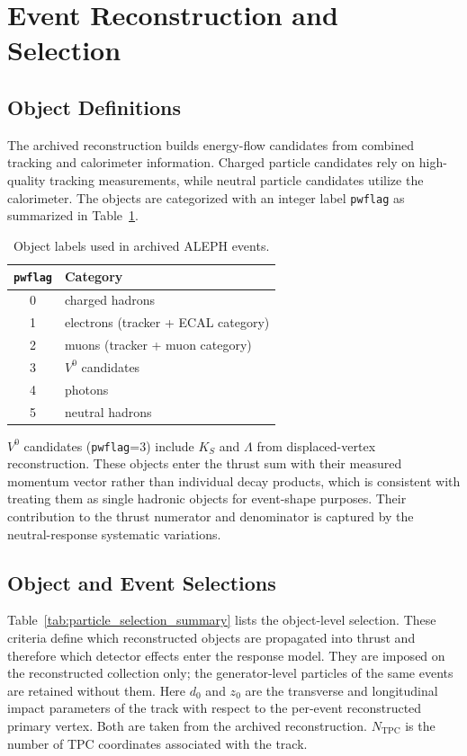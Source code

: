 \section{Event Reconstruction and Selection}
\label{sec:event_selection}

\subsection{Object Definitions}
\label{sec:particle_categories}

The archived reconstruction builds energy-flow candidates from combined
tracking and calorimeter information. Charged particle candidates rely on high-quality tracking
measurements, while neutral particle candidates utilize the calorimeter. The objects are categorized with an integer label \texttt{pwflag} as summarized in Table~\ref{tab:pwflag_definition}.

\begin{table}[ht!]
\centering
\begin{tabular}{c l}
\hline
\texttt{pwflag} & Category \\
\hline
0 & charged hadrons \\
1 & electrons (tracker + ECAL category) \\
2 & muons (tracker + muon category) \\
3 & $V^{0}$ candidates \\
4 & photons \\
5 & neutral hadrons \\
\hline
\end{tabular}
\caption{Object labels used in archived ALEPH events.}
\label{tab:pwflag_definition}
\end{table}

\noindent $V^0$ candidates (\texttt{pwflag}=3) include $K_S$ and $\Lambda$ from displaced-vertex reconstruction. These objects enter the thrust sum with their measured momentum vector rather than individual decay products, which is consistent with treating them as single hadronic objects for event-shape purposes. Their contribution to the thrust numerator and denominator is captured by the neutral-response systematic variations.

\subsection{Object and Event Selections}
\label{sec:object_selection}

Table~\ref{tab:particle_selection_summary} lists the object-level selection. These criteria define which reconstructed objects are propagated into thrust and therefore which detector effects enter the response model. They are imposed on the reconstructed collection only; the generator-level particles of the same events are retained without them. Here $d_0$ and $z_0$ are the transverse and longitudinal impact parameters of the track with respect to the per-event reconstructed primary vertex. Both are taken from the archived reconstruction. $N_{\mathrm{TPC}}$ is the number of TPC coordinates associated with the track.

